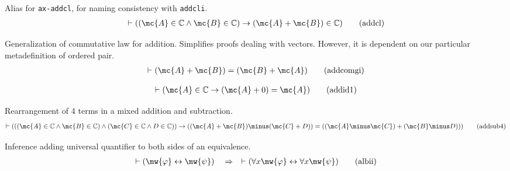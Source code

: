 \begin{lemma} {Alias for {\tt ax-addcl},} for naming
consistency with {\tt addcli}.  
\begin{align}
\vdash ( ( \mc{A} \in \mathbb{C} \wedge \mc{B} \in \mathbb{C} ) \rightarrow ( \mc{A} + \mc{B} ) \in
    \mathbb{C} )\label{eq:addcl}\tag{addcl}
\end{align}
\end{lemma}


\begin{lemma} {Generalization of commutative law for
addition.}  Simplifies proofs dealing
     with vectors.  However, it is dependent on our particular metadefinition of
     ordered pair.  
\begin{align}
\vdash ( \mc{A} + \mc{B} ) = ( \mc{B} + \mc{A} )\label{eq:addcomgi}\tag{addcomgi}
\end{align}
\end{lemma}


\begin{lemma}   
\begin{align}
\vdash ( \mc{A} \in \mathbb{C} \rightarrow ( \mc{A} + 0 ) = \mc{A} )\label{eq:addid1}\tag{addid1}
\end{align}
\end{lemma}


\begin{lemma} {Rearrangement of 4 terms in a mixed
addition and subtraction.}
\begin{align}
\vdash ( ( ( \mc{A} \in \mathbb{C} \wedge \mc{B} \in \mathbb{C} ) \wedge ( \mc{C} \in
    \mathbb{C} \wedge D \in \mathbb{C} ) ) \rightarrow ( ( \mc{A} + \mc{B} ) \minus ( \mc{C} +
    D ) ) = ( ( \mc{A} \minus \mc{C} ) + ( \mc{B} \minus D ) )
    )\label{eq:addsub4}\tag{addsub4}
\end{align}
\end{lemma}


\begin{lemma} {Inference adding universal quantifier to both
sides of an equivalence.}
\begin{align}
\vdash ( \mw{\varphi} \leftrightarrow \mw{\psi} )\quad\Rightarrow\quad \vdash ( \forall x
    \mw{\varphi} \leftrightarrow \forall x \mw{\psi} )\label{eq:albii}\tag{albii}
\end{align}
\end{lemma}


